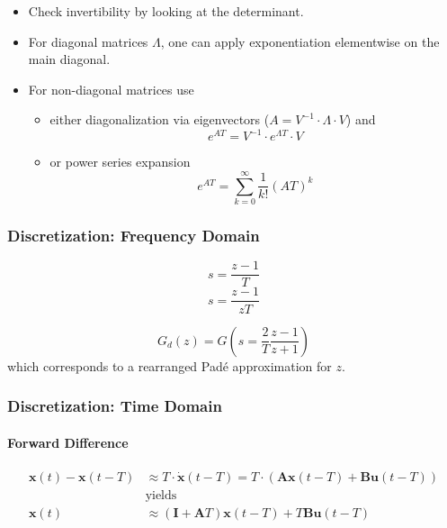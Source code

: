 \newpar{}
\begin{itemize}
    \item Check invertibility by looking at the determinant.
    \item For diagonal matrices $\Lambda$, one can apply exponentiation elementwise on the main diagonal.
    \item For non-diagonal matrices use
          \begin{itemize}
              \item either diagonalization via eigenvectors ($A=V^{-1}\cdot \Lambda \cdot V$) and
                    \begin{equation*}
                        e^{AT} = V^{-1}\cdot e^{\Lambda T} \cdot V
                    \end{equation*}
              \item or power series expansion
                    \begin{equation*}
                        e^{AT}=\sum_{k=0}^{\infty}\frac{1}{k!}{\left(AT\right)}^k
                    \end{equation*}
          \end{itemize}
\end{itemize}

\subsubsection{Discretization: Frequency Domain}\label{disc::tustin}
\noindent\begin{equation*}
    s = \frac{z-1}{T}
\end{equation*}
\noindent\begin{equation*}
    s = \frac{z-1}{zT}
\end{equation*}

\begin{equation*}
    G_{d}(z)=G\left(s=\frac2T\frac{z-1}{z+1}\right)
\end{equation*}
which corresponds to a rearranged Padé approximation for $z$.

\subsubsection{Discretization: Time Domain}

\paragraph{Forward Difference}
\noindent\begin{align*}
    \mathbf{x}(t)-\mathbf{x}(t-T) & \approx T\cdot\dot{\mathbf{x}}(t-T) =T\cdot(\mathbf{Ax}(t-T)+\mathbf{Bu}(t-T)) \\
                                  & \text{yields}                                                                  \\
    \mathbf{x}(t)                 & \approx(\mathbf{I}+\mathbf{A}T)\mathbf{x}(t-T)+T\mathbf{Bu}(t-T)
\end{align*}

